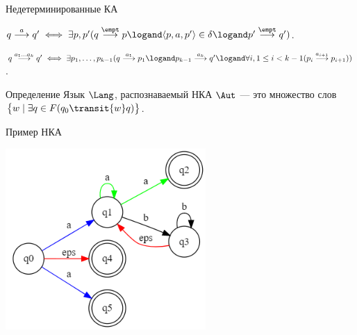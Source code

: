 \begin{frame}{Недетерминированные КА}
{\begin{wideitemize}
            \item $q\overset{a}{\longrightarrow}q'\iff \exists p,p'(q\overset{\empt}{\longrightarrow}p\logand \langle p, a, p'\rangle\in\delta\logand p'\overset{\empt}{\longrightarrow}q')$.

            \item $q \overset{a_1\dots a_k}{\longrightarrow} q'\iff \exists p_1,\dots,p_{k-1}(q\overset{a_1}{\longrightarrow}p_1\logand p_{k-1}\overset{a_k}{\longrightarrow}q'\logand \forall i,1\leq i<k-1(p_i\overset{a_{i+1}}{\longrightarrow}p_{i+1}))$.
        \end{wideitemize}

        \vspace{-5pt}
        \begin{block}{Определение}
            Язык $\Lang$, распознаваемый НКА $\Aut$ --- это множество слов $\bigl\lbrace{}w\mid\exists q\in F (q_0\transit{w}q)\bigr\rbrace{}$.
        \end{block}
    }
\end{frame} %

\begin{frame}{Пример НКА}
    \vspace{-5pt}
    \begin{center}
        \includegraphics[width=3in, keepaspectratio]{tompson1.png} %
    \end{center}
\end{frame}%

